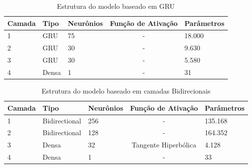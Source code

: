 \begin{table}[h!] \label{tabela:gru_struct}
    \caption{Estrutura do modelo baseado em GRU}
    \begin{tabularx}{\textwidth}{X|X|X|c|X} \hline
    Camada & Tipo & Neurônios & Função de Ativação & Parâmetros \\ \hline
    1                   & GRU                     & 75                     & -                           & 18.000                 \\ \hline
    2                   & GRU                     & 30                     & -                           & 9.630                  \\ \hline
    3                   & GRU                     & 30                     & -                           & 5.580                  \\ \hline
    4                   & Densa                   & 1                      & -                           & 31                     \\ \hline
    \end{tabularx}
\end{table}

\begin{table}[h!] \label{tabela:bidirectional_struct}
    \caption{Estrutura do modelo baseado em camadas Bidirecionais}
    \begin{tabularx}{\textwidth}{X|X|X|c|X} \hline
    Camada & Tipo & Neurônios & Função de Ativação & Parâmetros \\ \hline
    1                   & Bidirectional            & 256                    & -                           & 135.168                \\ \hline
    2                   & Bidirectional            & 128                    & -                           & 164.352                \\ \hline
    3                   & Densa                   & 32                     & Tangente Hiperbólica                           & 4.128                  \\ \hline
    4                   & Densa                   & 1                      & -                           & 33                     \\ \hline
    \end{tabularx}
\end{table}
    





